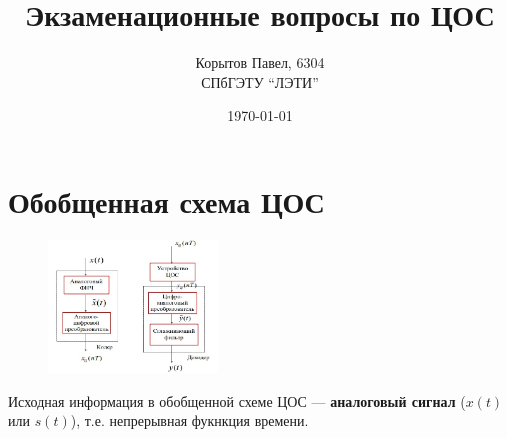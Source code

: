 \documentclass[a4paper, 14pt]{extarticle}
\title{Экзаменационные вопросы по ЦОС}
\author{Корытов Павел, 6304 \\ СПбГЭТУ \enquote{ЛЭТИ}}
\date{\today}
\begin{document}
\maketitle

\setcounter{secnumdepth}{4}
\setcounter{tocdepth}{1}
\tableofcontents{}
\section{Обобщенная схема ЦОС}
\begin{figure}[h]
    \centering
    \includegraphics[width=0.4\textwidth]{img/S001.jpg}
\end{figure}
Исходная информация в обобщенной схеме ЦОС --- \textbf{аналоговый сигнал} ($x(t)$ или $s(t)$), т.е. непрерывная фукнкция времени.
\end{document}
